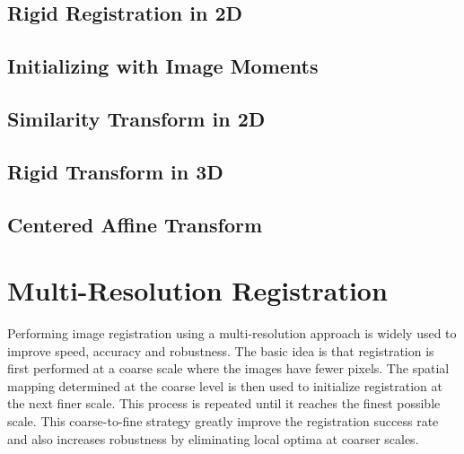 \subsection{Rigid Registration in 2D}
\label{sec:RigidRegistrationIn2D}
\ifitkFullVersion

\fi

\subsection{Initializing with Image Moments}
\label{sec:InitializingRegistrationWithMoments}
\ifitkFullVersion

\fi



\subsection{Similarity Transform in 2D}
\label{sec:SimilarityRegistrationIn2D}
\ifitkFullVersion

\fi



\subsection{Rigid Transform in 3D}
\label{sec:RigidRegistrationIn3D}
\ifitkFullVersion

\fi




\subsection{Centered Affine Transform}
\label{sec:CenteredAffineTransform}
\ifitkFullVersion

\fi




\section{Multi-Resolution Registration}
\label{sec:MultiResolutionRegistration}
Performing image registration using a multi-resolution approach is widely used
to improve speed, accuracy and robustness. The basic idea is that registration
is first performed at a coarse scale where the images have fewer pixels.
The spatial mapping determined at the coarse level is then used to initialize
registration at the next finer scale. This process is repeated until it
reaches the finest possible scale. This coarse-to-fine strategy greatly
improve the registration success rate and also increases robustness
by eliminating local optima at coarser scales.

